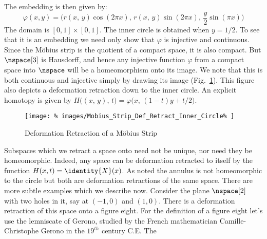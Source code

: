 \documentclass{book}                                                           %
\begin{document}
                The embedding is then given by:
                \begin{equation}
                    \varphi(x,y)=
                    \big(r(x,\,y)\cos(2\pi{x}),\,
                         r(x,\,y)\sin(2\pi{x}),\,
                         \frac{y}{2}\sin(\pi{x})\big)
                \end{equation}
                The domain is $[0,1]\times[0,1]$. The inner circle is
                obtained when $y=1/2$. To see that it is an embedding we need
                only show that $\varphi$ is injective and continuous. Since
                the M\"{o}bius strip is the quotient of a compact space, it is
                also compact. But $\nspace[3]$ is Hausdorff, and hence any
                injective function $\varphi$ from a compact space into $\nspace$
                will be a homeomorphism onto its image. We note that this is
                both continuous and injective simply by drawing its image
                (Fig.~\ref{fig:Def_Retract_Mobius_Strip}). This figure also
                depicts a deformation retraction down to the inner circle.
                An explicit homotopy is given by
                $H\big((x,\,y),\,t\big)=\varphi\big(x,\,(1-t)y+t/2\big)$.
                \begin{figure}[H]
                    \centering
                    \captionsetup{type=figure}
                    \texttt{[image: \%
                        images/Mobius\_Strip\_Def\_Retract\_Inner\_Circle\%
                    ]}
                    \caption{Deformation Retraction of a M\"{o}bius Strip}
                    \label{fig:Def_Retract_Mobius_Strip}
                \end{figure}
                Subspaces which we retract a space onto need not be unique, nor
                need they be homeomorphic. Indeed, any space can be deformation
                retracted to itself by the function $H(x,t)=\identity{X}(x)$.
                As noted the annulus is not homeomorphic to the circle but both
                are deformation retractions of the same space. There are more
                subtle examples which we describe now. Consider the plane
                $\nspace[2]$ with two holes in it, say at $(\minus{1},0)$ and
                $(1,0)$. There is a deformation retraction of this space onto a
                figure eight. For the definition of a figure eight let's use the
                lemniscate of Gerono, studied by the French mathematician
                Camille-Christophe Gerono in the $19^{th}$ century C.E. The
\end{document}

